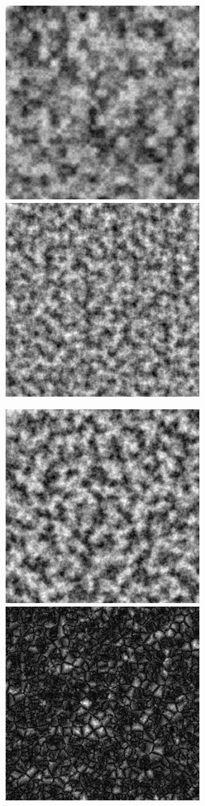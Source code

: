 \documentclass[a4paper]{article}
\begin{document}
    \begin{figure}[!ht]
    \begin{center}
    \includegraphics[width=0.4\linewidth]{img/noise/value.png}
    \includegraphics[width=0.4\linewidth]{img/noise/perlin.png}
    \end{center}
    \begin{center}
    \includegraphics[width=0.4\linewidth]{img/noise/simplex.png}
     \includegraphics[width=0.4\linewidth]{img/noise/voronoi.png}

\end{center}
\end{figure}
\end{document}
